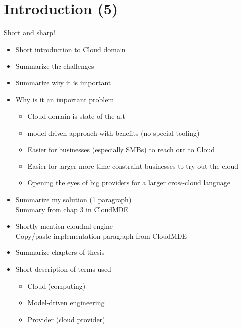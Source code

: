 \section{Introduction (5)}

Short and sharp!

\begin{itemize}
  \item Short introduction to Cloud domain
  \item Summarize the challenges
  \item Summarize why it is important
  \item Why is it an important problem
    \begin{itemize}
      \item Cloud domain is state of the art
      \item model driven approach with benefits (no special tooling)
      \item Easier for businesses (especially SMBs) to reach out to Cloud
      \item Easier for larger more time-constraint businesses to try out the cloud
      \item Opening the eyes of big providers for a larger cross-cloud language
    \end{itemize}
  \item Summarize my solution (1 paragraph) \\
      Summary from chap 3 in CloudMDE
  \item Shortly mention cloudml-engine \\
      Copy/paste implementation paragraph from CloudMDE
  \item Summarize chapters of thesis
  \item Short description of terms used
    \begin{itemize}
      \item Cloud (computing)
      \item Model-driven engineering
      \item Provider (cloud provider)
    \end{itemize}
\end{itemize}
